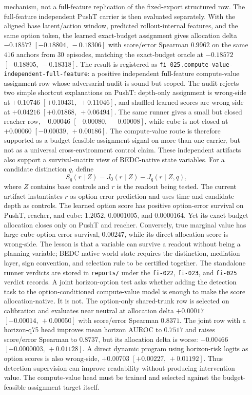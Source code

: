 mechanism, not a full-feature replication of the fixed-export structured row.
The full-feature independent PushT carrier is then evaluated separately.  With
the aligned base latent/action window, predicted rollout-internal features,
and the same option token, the learned exact-budget assignment gives
allocation delta $-0.18572$ $[-0.18804,\ -0.18306]$ with score/error Spearman
$0.9962$ on the same $416$ anchors from $30$ episodes, matching the
exact-budget oracle at $-0.18572$ $[-0.18805,\ -0.18318]$.  The result is
registered as \texttt{fi-025.compute-value-independent-full-feature}: a
positive independent full-feature compute-value assignment row whose
adversarial audit is sound but scoped.  The audit rejects two simple shortcut
explanations on PushT: depth-only assignment is wrong-side at $+0.10746$
$[+0.10431,\ +0.11046]$, and shuffled learned scores are wrong-side at
$+0.04216$ $[+0.01868,\ +0.06494]$.  The same runner gives a small but closed
reacher row, $-0.00046$ $[-0.00080,\ -0.00008]$, while cube is not closed at
$+0.00060$ $[-0.00039,\ +0.00186]$.  The compute-value route is therefore
supported as a budget-feasible assignment signal on more than one carrier,
but not as a universal cross-environment control claim.
These independent artifacts also support a survival-matrix view of
BEDC-native state variables.  For a candidate distinction $q$, define
$$
S_q(r\mid Z)=J_0(r\mid Z)-J_q(r\mid Z,q),
$$
where $Z$ contains base controls and $r$ is the readout being tested.  The
current artifact instantiates $r$ as option-error prediction and uses time and
candidate depth as controls.  The learned option score has positive
option-error survival on PushT, reacher, and cube: $1.2052$, $0.0001005$, and
$0.0000164$.  Yet its exact-budget allocation closes only on PushT and
reacher.  Conversely, true marginal value has large cube option-error
survival, $0.00247$, while its direct allocation score is wrong-side.  The
lesson is that a variable can survive a readout without being a planning
variable; BEDC-native world state requires the distinction, mediation layer,
sign convention, and selection rule to be certified together.
The standalone runner verdicts are stored in \texttt{reports/} under the
\texttt{fi-022}, \texttt{fi-023}, and \texttt{fi-025} verdict records.
A joint horizon-option test asks whether adding the detection task to the
option-conditioned compute-value model is enough to make the score
allocation-native.  It is not.  The option-only shared-trunk row is selected on
calibration and evaluates near neutral at allocation delta $+0.00017$
$[-0.00014,\ +0.00050]$ with score/error Spearman $0.8371$.  The joint row
with a horizon-q75 head improves mean horizon AUROC to $0.7517$ and raises
score/error Spearman to $0.8737$, but its allocation delta is worse:
$+0.00466$ $[+0.0000003,\ +0.01128]$.  A direct dynamic program using
horizon-risk logits as option scores is also wrong-side, $+0.00703$
$[+0.00227,\ +0.01192]$.  Thus detection supervision can improve readability
without producing intervention value.  The compute-value head must be trained
and selected against the budget-feasible assignment target itself.

